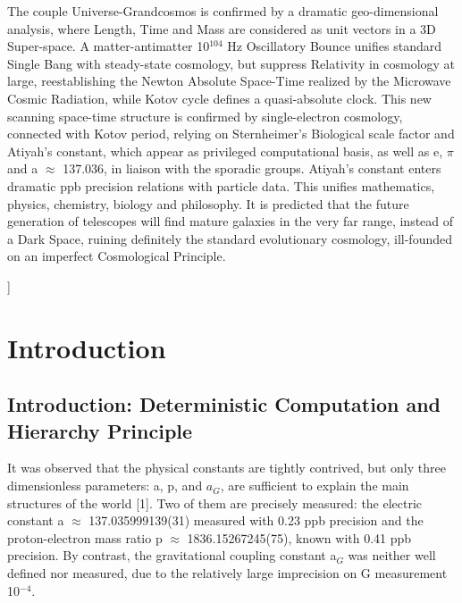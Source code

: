 \documentclass[twoside,draft]{article}
\begin{document}
\begin{sloppypar}
\begin{center}
{{The couple Universe-Grandcosmos is confirmed by a dramatic geo-dimensional analysis, where Length, Time and Mass are considered as unit vectors in a 3D Super-space. A matter-antimatter 10$^{104}\!$ Hz Oscillatory Bounce unifies standard Single Bang with steady-state cosmology, but suppress Relativity in cosmology at large, reestablishing the Newton Absolute Space-Time realized by the Microwave Cosmic Radiation, while Kotov cycle defines a quasi-absolute clock.
This new scanning space-time structure is confirmed by single-electron cosmology, connected with Kotov period, relying on Sternheimer's Biological scale factor and Atiyah's constant, which appear as privileged computational basis, as well as e, $\pi$ and a $\approx$ 137.036, in liaison with the sporadic groups.
Atiyah's constant enters dramatic ppb precision relations with particle data. This unifies mathematics, physics, chemistry, biology and philosophy. It is predicted that the future generation of telescopes will find mature galaxies in the very far range, instead of a Dark Space, ruining definitely the standard evolutionary cosmology, ill-founded on an imperfect Cosmological Principle.
}}\smallskip
\end{center}]{%


\setcounter{section}{0}
\setcounter{equation}{0}
\setcounter{figure}{0}
\setcounter{table}{0}
\setcounter{page}{1}



\section{Introduction}
\subsection{Introduction: Deterministic Computation and Hierarchy Principle}
It was observed that the physical constants are tightly contrived, but only three dimensionless parameters: a, p, and $a_{G}$, are sufficient to explain the main structures of the world [1]. Two of them are precisely measured: the electric constant a $\approx$ 137.035999139(31) measured with 0.23 ppb precision and the proton-electron mass ratio p $\approx$ 1836.15267245(75), known with 0.41 ppb precision. By contrast, the gravitational coupling constant a$_{G}\!$ was neither well defined nor measured, due to the relatively large imprecision on G measurement 10$^{-4}\!$.

}
\end{sloppypar}
\end{document}
